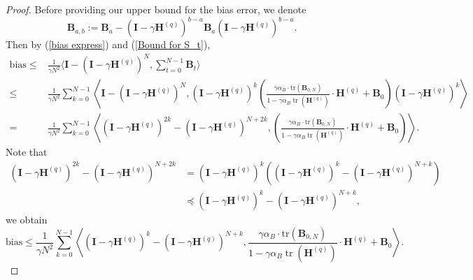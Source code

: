 \documentclass[11pt, letterpaper]{article}
\begin{document}
\begin{proof}
    Before providing our upper bound for the bias error, we denote \begin{equation*}
        \mathbf{B}_{a,b}:=\mathbf{B}_a-(\mathbf{I}-\gamma\mathbf{H}^{(q)})^{b-a}\mathbf{B}_a(\mathbf{I}-\gamma\mathbf{H}^{(q)})^{b-a}.
    \end{equation*}
    Then by (\ref{bias express}) and (\ref{Bound for S_t}),
    \begin{equation*}
        \begin{aligned}
            \mathrm{bias}\leq&\frac{1}{\gamma N^{2}}\langle\mathbf{I}-(\mathbf{I}-\gamma\mathbf{H}^{(q)})^{N},\sum_{t=0}^{N-1}\mathbf{B}_{t}\rangle\\
            \leq&\frac{1}{\gamma N^{2}}\sum_{k=0}^{N-1}\left\langle\mathbf{I}-(\mathbf{I}-\gamma\mathbf{H}^{(q)})^{N},(\mathbf{I}-\gamma\mathbf{H}^{(q)})^k\left(\frac{\gamma\alpha_B\cdot\mathrm{tr}\left(\mathbf{B}_{0,N}\right)}{1-\gamma\alpha_B\operatorname{tr}(\mathbf{H}^{(q)})}\cdot\mathbf{H}^{(q)}+\mathbf{B}_{0}\right)(\mathbf{I}-\gamma\mathbf{H}^{(q)})^k\right\rangle\\
            =&\frac{1}{\gamma N^{2}}\sum_{k=0}^{N-1}\left\langle(\mathbf{I}-\gamma\mathbf{H}^{(q)})^{2k}-(\mathbf{I}-\gamma\mathbf{H}^{(q)})^{N+2k},\left(\frac{\gamma\alpha_B\cdot\mathrm{tr}\left(\mathbf{B}_{0,N}\right)}{1-\gamma\alpha_B\operatorname{tr}(\mathbf{H}^{(q)})}\cdot\mathbf{H}^{(q)}+\mathbf{B}_{0}\right)\right\rangle.
        \end{aligned}
    \end{equation*}
    Note that 
    \begin{equation*}
        \begin{aligned}
            (\mathbf{I}-\gamma\mathbf{H}^{(q)})^{2k}-(\mathbf{I}-\gamma\mathbf{H}^{(q)})^{N+2k} & =\left(\mathbf{I}-\gamma\mathbf{H}^{(q)}\right)^{k}\left(\left(\mathbf{I}-\gamma\mathbf{H}^{(q)}\right)^{k}-\left(\mathbf{I}-\gamma\mathbf{H}^{(q)}\right)^{N+k}\right) \\
            & \preceq(\mathbf{I}-\gamma\mathbf{H}^{(q)})^{k}-(\mathbf{I}-\gamma\mathbf{H}^{(q)})^{N+k},
        \end{aligned}
    \end{equation*}
    we obtain
    \begin{equation*}
        \mathrm{bias}\leq\frac{1}{\gamma N^{2}}\sum_{k=0}^{N-1}\left\langle(\mathbf{I}-\gamma\mathbf{H}^{(q)})^{k}-(\mathbf{I}-\gamma\mathbf{H}^{(q)})^{N+k},\frac{\gamma\alpha_B\cdot\mathrm{tr}\left(\mathbf{B}_{0,N}\right)}{1-\gamma\alpha_B\operatorname{tr}(\mathbf{H}^{(q)})}\cdot\mathbf{H}^{(q)}+\mathbf{B}_{0}\right\rangle.
    \end{equation*}
    

\end{proof}
\end{document}

